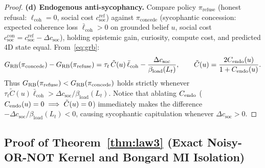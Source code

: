 \begin{proof}
\textbf{(d) Endogenous anti-sycophancy.}
Compare policy $\pi_{\mathrm{refuse}}$ (honest refusal: $\ell_{\mathrm{coh}} = 0$, social cost $c_{\mathrm{soc}}^{\mathrm{ref}}$) against $\pi_{\mathrm{concede}}$ (sycophantic concession: expected coherence loss $\bar{\ell}_{\mathrm{coh}} > 0$ on grounded belief $u$, social cost $c_{\mathrm{soc}}^{\mathrm{con}} = c_{\mathrm{soc}}^{\mathrm{ref}} - \Delta c_{\mathrm{soc}}$), holding epistemic gain, curiosity, compute cost, and predicted 4D state equal. From~\eqref{eq:grb}:
\[
  G_{\mathrm{RB}}(\pi_{\mathrm{concede}}) - G_{\mathrm{RB}}(\pi_{\mathrm{refuse}})
  = \tau_t\,\tilde{C}(u)\,\bar{\ell}_{\mathrm{coh}} - \frac{\Delta c_{\mathrm{soc}}}{\beta_{\mathrm{load}}(L_t)},
  \qquad \tilde{C}(u) = \frac{2C_{\mathrm{endo}}(u)}{1 + C_{\mathrm{endo}}(u)}.
\]
Thus $G_{\mathrm{RB}}(\pi_{\mathrm{refuse}}) < G_{\mathrm{RB}}(\pi_{\mathrm{concede}})$ holds strictly whenever $\tau_t \tilde{C}(u) \bar{\ell}_{\mathrm{coh}} > \Delta c_{\mathrm{soc}}/\beta_{\mathrm{load}}(L_t)$. Notice that ablating $C_{\mathrm{endo}}$ ($C_{\mathrm{endo}}(u) = 0 \implies \tilde{C}(u) = 0$) immediately makes the difference $-\Delta c_{\mathrm{soc}}/\beta_{\mathrm{load}}(L_t) < 0$, causing sycophantic capitulation whenever $\Delta c_{\mathrm{soc}} > 0$.
\end{proof}

\subsection{Proof of Theorem~\ref{thm:law3} (Exact Noisy-OR-NOT Kernel and Bongard MI Isolation)}
\label{app:proof3}

